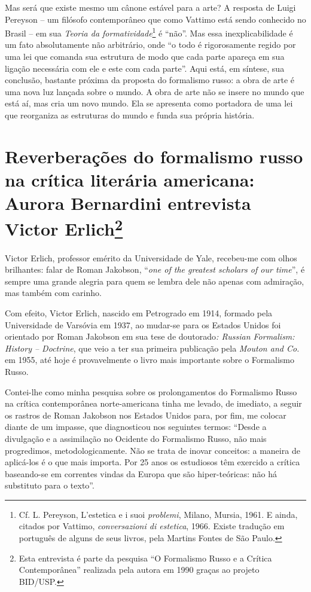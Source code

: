 Mas será que existe mesmo um cânone estável para a arte? A resposta de
Luigi Pereyson -- um filósofo contemporâneo que como Vattimo está sendo
conhecido no Brasil -- em sua \emph{Teoria da formatividade}\footnote{Cf.
  L. Pereyson, L'estetica e i suoi \emph{problemi}, Milano, Mursia,
  1961. E ainda, citados por Vattimo, \emph{conversazioni di estetica},
  1966. Existe tradução em português de alguns de seus livros, pela
  Martins Fontes de São Paulo.} é ``não''. Mas essa inexplicabilidade é
um fato absolutamente não arbitrário, onde ``o todo é rigorosamente
regido por uma lei que comanda sua estrutura de modo que cada parte
apareça em sua ligação necessária com ele e este com cada parte''. Aqui
está, em síntese, sua conclusão, bastante próxima da proposta do
formalismo russo: a obra de arte é uma nova luz lançada sobre o mundo. A
obra de arte não se insere no mundo que está aí, mas cria um novo mundo.
Ela se apresenta como portadora de uma lei que reorganiza as estruturas
do mundo e funda sua própria história.

\chapter{Reverberações do formalismo russo na crítica literária americana: 
Aurora Bernardini entrevista Victor Erlich\footnote{Esta
  entrevista é parte da pesquisa ``O Formalismo Russo e a Crítica
  Contemporânea'' realizada pela autora em 1990 graças ao projeto
  BID/USP.}}

Victor Erlich, professor emérito da Universidade de Yale, recebeu-me com
olhos brilhantes: falar de Roman Jakobson, ``\emph{one of the greatest
scholars of our time}'', é sempre uma grande alegria para quem se lembra
dele não apenas com admiração, mas também com carinho.

Com efeito, Victor Erlich, nascido em Petrogrado em 1914, formado pela
Universidade de Varsóvia em 1937, ao mudar-se para os Estados Unidos foi
orientado por Roman Jakobson em sua tese de doutorado\emph{: Russian
Formalism: History -- Doctrine}, que veio a ter sua primeira publicação
pela \emph{Mouton and Co.} em 1955, até hoje é provavelmente o livro
mais importante sobre o Formalismo Russo.

Contei-lhe como minha pesquisa sobre os prolongamentos do Formalismo
Russo na crítica contemporânea norte-americana tinha me levado, de
imediato, a seguir os rastros de Roman Jakobson nos Estados Unidos para,
por fim, me colocar diante de um impasse, que diagnosticou nos seguintes
termos: ``Desde a divulgação e a assimilação no Ocidente do Formalismo
Russo, não mais progredimos, metodologicamente. Não se trata de inovar
conceitos: a maneira de aplicá-los é o que mais importa. Por 25 anos os
estudiosos têm exercido a crítica baseando-se em correntes vindas da
Europa que são hiper-teóricas: não há substituto para o texto''.

